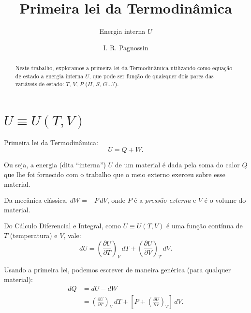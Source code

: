 \documentclass[a4paper,12pt]{scrartcl}
\title{Primeira lei da Termodinâmica}
\subtitle{Energia interna $U$}
\author{I. R. Pagnossin}
\begin{document}
\maketitle

\begin{abstract}
  Neste trabalho, exploramos a primeira lei da Termodinâmica utilizando como equação de estado a energia interna $U$, que pode ser função de quaisquer dois pares das variáveis de estado: $T$, $V$, $P$ ($H$, $S$, $G$...?).
\end{abstract}

\newcommand\D[3]{\ensuremath{\left(\frac{\partial #1}{\partial #2}\right)_{#3}}}

\section{$U \equiv U(T,V)$}

  Primeira lei da Termodinâmica:
  \begin{equation}\label{eq:1st-law}
  U = Q + W. 
  \end{equation}

  Ou seja, a energia (dita ``interna'') $U$ de um material é dada pela soma do calor $Q$ que lhe foi fornecido com o trabalho que o meio externo exerceu sobre esse material.
  
  Da mecânica clássica, $dW = -P\, dV$, onde $P$ é a \emph{pressão externa} e $V$ é o volume do material.
  
  Do Cálculo Diferencial e Integral, como $U \equiv U(T,V)$ é uma função contínua de $T$ (temperatura) e $V$, vale:
  \begin{equation*}
  dU = \D{U}{T}{V}\, dT + \D{U}{V}{T}\, dV.
  \end{equation*}
  
  Usando a primeira lei, podemos escrever de maneira genérica (para qualquer material):
  \begin{align}
  dQ &= dU - dW \nonumber\\
     &= \D{U}{T}{V}\, dT+ \left[P + \D{U}{V}{T}\right]\, dV.\label{eq:dQ}
  \end{align}
\end{document}
